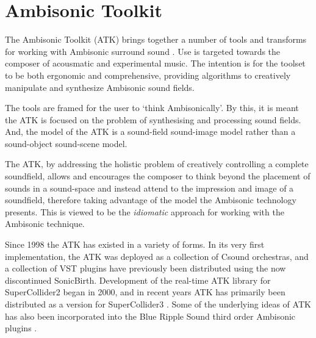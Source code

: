 \documentclass{article}
\begin{document}
\section{Ambisonic Toolkit}\label{sec:atk}

The Ambisonic Toolkit (ATK) brings together a number of tools and transforms for working with Ambisonic surround sound  \cite{Anderson:2009introducingATK, anderson:ambisonic_2011}.
Use is targeted towards the composer of acousmatic and experimental music. The intention is for the toolset to be both ergonomic and comprehensive, providing algorithms to creatively manipulate and synthesize Ambisonic sound fields.

The tools are framed for the user to `think Ambisonically'. By this, it is meant the ATK is focused on the problem of synthesising and processing sound fields. And, the model of the ATK is a sound-field sound-image model rather than a sound-object sound-scene model. 


The ATK, by addressing the holistic problem of creatively controlling a complete soundfield, allows and encourages the composer to think beyond the placement of sounds in a sound-space and instead attend to the impression and image of a soundfield, therefore taking advantage of the model the Ambisonic technology presents.
This is viewed to be the {\em idiomatic} approach for working with the Ambisonic technique.

Since 1998 the ATK has existed in a variety of forms.
In its very first implementation, the ATK was deployed as a collection of Csound orchestras, and a collection of VST plugins have previously been distributed using the now discontinued SonicBirth.
Development of the real-time ATK library for SuperCollider2 began in 2000, and in recent years ATK has primarily been distributed as a version for SuperCollider3 \cite{Anderson:2009introducingATK}.
Some of the underlying ideas of ATK has also been incorporated into the Blue Ripple Sound third order Ambisonic plugins \cite{blueripple:2014TOA}.
\end{document}

